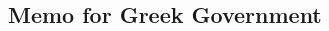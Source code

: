 \begin{multicols}{2}
	\section*{Memo for Greek Government}
	\lipsum[1-4] %
	\lipsum[5-8]
\end{multicols}
